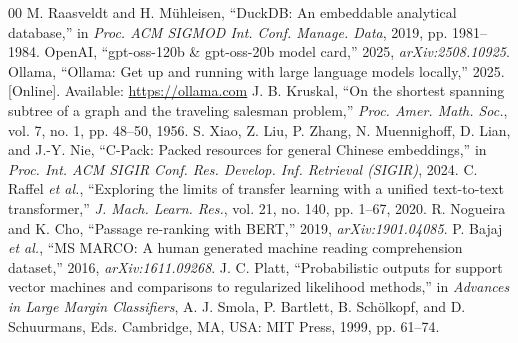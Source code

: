 \documentclass[conference]{IEEEtran}
\begin{document}
\begin{thebibliography}{00}
 M. Raasveldt and H. Mühleisen, ``DuckDB: An embeddable analytical database,'' in \emph{Proc. ACM SIGMOD Int. Conf. Manage. Data}, 2019, pp. 1981--1984.
 OpenAI, ``gpt-oss-120b \& gpt-oss-20b model card,'' 2025, \emph{arXiv:2508.10925}.
 Ollama, ``Ollama: Get up and running with large language models locally,'' 2025. [Online]. Available: \url{https://ollama.com}
 J. B. Kruskal, ``On the shortest spanning subtree of a graph and the traveling salesman problem,'' \emph{Proc. Amer. Math. Soc.}, vol. 7, no. 1, pp. 48--50, 1956.
 S. Xiao, Z. Liu, P. Zhang, N. Muennighoff, D. Lian, and J.-Y. Nie, ``C-Pack: Packed resources for general Chinese embeddings,'' in \emph{Proc. Int. ACM SIGIR Conf. Res. Develop. Inf. Retrieval (SIGIR)}, 2024.
 C. Raffel \emph{et al.}, ``Exploring the limits of transfer learning with a unified text-to-text transformer,'' \emph{J. Mach. Learn. Res.}, vol. 21, no. 140, pp. 1--67, 2020.
 R. Nogueira and K. Cho, ``Passage re-ranking with BERT,'' 2019, \emph{arXiv:1901.04085}.
 P. Bajaj \emph{et al.}, ``MS MARCO: A human generated machine reading comprehension dataset,'' 2016, \emph{arXiv:1611.09268}.
 J. C. Platt, ``Probabilistic outputs for support vector machines and comparisons to regularized likelihood methods,'' in \emph{Advances in Large Margin Classifiers}, A. J. Smola, P. Bartlett, B. Schölkopf, and D. Schuurmans, Eds. Cambridge, MA, USA: MIT Press, 1999, pp. 61--74.
\end{thebibliography}
\end{document}
